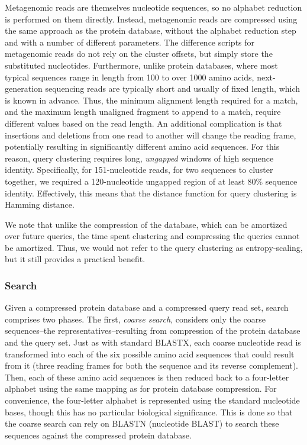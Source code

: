 \documentclass[review,preprint,12pt]{elsarticle}
\theoremstyle{definition}
\theoremstyle{remark}
\numberwithin{equation}{section}
\begin{document}
Metagenomic reads are themselves nucleotide sequences, so no alphabet reduction
is performed on them directly.
Instead, metagenomic reads are compressed using the same approach as the
protein database, without the alphabet reduction step and with a number of
different parameters.
The difference scripts for metagenomic reads do not rely on the cluster offsets,
but simply store the substituted nucleotides.
Furthermore, unlike protein databases, where most typical sequences range in 
length from 100 to over 1000 amino acids, next-generation sequencing reads are 
typically short and usually of fixed length, which is known in advance.
Thus, the minimum alignment length required for a match, and the maximum
length unaligned fragment to append to a match, require different values based
on the read length.
An additional complication is that insertions and deletions from one read to
another will change the reading frame, potentially resulting in significantly
different amino acid sequences.
For this reason, query clustering requires long, \emph{ungapped} windows of high
sequence identity.
Specifically, for 151-nucleotide reads, for two sequences to cluster together,
we required a 120-nucleotide ungapped region of at least 80\% sequence identity.
Effectively, this means that the distance function for query clustering is
Hamming distance.

We note that unlike the compression of the database, which can be amortized 
over future queries, the time spent clustering and compressing the queries 
cannot be amortized.
Thus, we would not refer to the query clustering as entropy-scaling, but it
still provides a practical benefit.

\subsubsection{Search}

Given a compressed protein database and a compressed query read set, search
comprises two phases.
The first, \emph{coarse search}, considers only the coarse sequences--the
representatives--resulting from compression of the protein database and the
query set.
Just as with standard BLASTX, each coarse nucleotide read is transformed into 
each of the six possible amino acid sequences that could result from it (three 
reading frames for both the sequence and its reverse complement).
Then, each of these amino acid sequences is then reduced back to a four-letter
alphabet using the same mapping as for protein database compression.
For convenience, the four-letter alphabet is represented using the standard
nucleotide bases, though this has no particular biological significance.
This is done so that the coarse search can rely on BLASTN (nucleotide BLAST) to
search these sequences against the compressed protein database.
\end{document}

